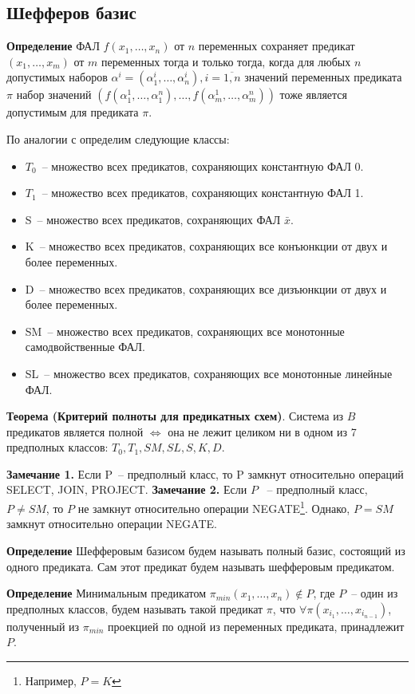 \documentclass[12pt]{article}
\begin{document}
\subsection{Шефферов базис}

\textbf{Определение} ФАЛ
$f (x_1, \ldots, x_n)$ от $n$ переменных сохраняет предикат $ (x_1, \ldots, x_m)$ от $m$
переменных тогда и только тогда, когда для любых $n$ допустимых наборов $\alpha^i = (\alpha_1^i, \ldots, \alpha_n^i), 
i = \overline{1, n}$ значений переменных предиката $\pi$ набор
значений $( f(\alpha_1^1, \ldots, \alpha_1^n), \ldots, f(\alpha_m^1, \ldots, \alpha_m^n) )$
тоже является допустимым для предиката $\pi$.

По аналогии с \cite{Shu11} определим следующие классы:
\begin{itemize}
    \item{$T_0$}~-- множество всех предикатов, сохраняющих константную ФАЛ 0.
    \item{$T_1$}~-- множество всех предикатов, сохраняющих константную ФАЛ 1.
    \item{S}~-- множество всех предикатов, сохраняющих ФАЛ $\bar{x}$.
    \item{K}~-- множество всех предикатов, сохраняющих все конъюнкции от двух и более переменных.
    \item{D}~-- множество всех предикатов, сохраняющих все дизъюнкции от двух и более переменных.
    \item{SM}~-- множество всех предикатов, сохраняющих все монотонные самодвойственные ФАЛ.
    \item{SL}~-- множество всех предикатов, сохраняющих все монотонные линейные ФАЛ.
\end{itemize}

\textbf{Теорема (Критерий полноты для предикатных схем)}. Система из $B$ предикатов является полной $\iff$
она не лежит целиком ни в одном из 7 предполных классов: $T_0, T_1, SM, SL, S, K, D$. \cite{Shu11} 

\textbf{Замечание 1.} Если P~-- предполный класс, то P замкнут относительно операций SELECT, JOIN, PROJECT.
\textbf{Замечание 2.} Если $P$ ~-- предполный класс, $P \neq SM$, то $P$ не замкнут
относительно операции NEGATE\footnote{Например, $P = K$}.
Однако, $P = SM$ замкнут относительно операции NEGATE.

\textbf{Определение} Шефферовым базисом будем называть полный базис, состоящий из одного предиката. Сам этот предикат
будем называть шефферовым предикатом.

\textbf{Определение} Минимальным предикатом $\pi_{min}(x_1, \dots, x_n) \notin P$, где $P$~-- один из предполных классов, будем называть такой 
предикат $\pi$, что $\forall \pi(x_{i_1}, \dots, x_{i_{n-1}})$, полученный из $\pi_{min}$ проекцией по одной из переменных
предиката, принадлежит $P$.
\end{document}

